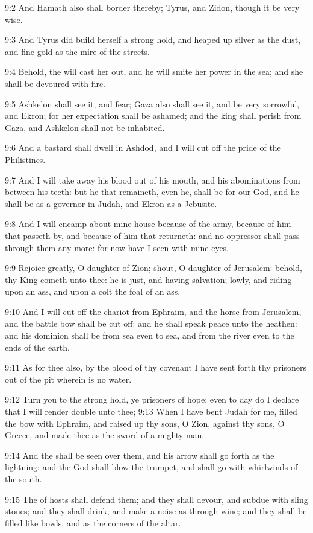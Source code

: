 9:2 And Hamath also shall border thereby; Tyrus, and Zidon, though it
be very wise.

9:3 And Tyrus did build herself a strong hold, and heaped up silver as
the dust, and fine gold as the mire of the streets.

9:4 Behold, the \LORD will cast her out, and he will smite her power in
the sea; and she shall be devoured with fire.

9:5 Ashkelon shall see it, and fear; Gaza also shall see it, and be
very sorrowful, and Ekron; for her expectation shall be ashamed; and
the king shall perish from Gaza, and Ashkelon shall not be inhabited.

9:6 And a bastard shall dwell in Ashdod, and I will cut off the pride
of the Philistines.

9:7 And I will take away his blood out of his mouth, and his
abominations from between his teeth: but he that remaineth, even he,
shall be for our God, and he shall be as a governor in Judah, and
Ekron as a Jebusite.

9:8 And I will encamp about mine house because of the army, because of
him that passeth by, and because of him that returneth: and no
oppressor shall pass through them any more: for now have I seen with
mine eyes.

9:9 Rejoice greatly, O daughter of Zion; shout, O daughter of
Jerusalem: behold, thy King cometh unto thee: he is just, and having
salvation; lowly, and riding upon an ass, and upon a colt the foal of
an ass.

9:10 And I will cut off the chariot from Ephraim, and the horse from
Jerusalem, and the battle bow shall be cut off: and he shall speak
peace unto the heathen: and his dominion shall be from sea even to
sea, and from the river even to the ends of the earth.

9:11 As for thee also, by the blood of thy covenant I have sent forth
thy prisoners out of the pit wherein is no water.

9:12 Turn you to the strong hold, ye prisoners of hope: even to day do
I declare that I will render double unto thee; 9:13 When I have bent
Judah for me, filled the bow with Ephraim, and raised up thy sons, O
Zion, against thy sons, O Greece, and made thee as the sword of a
mighty man.

9:14 And the \LORD shall be seen over them, and his arrow shall go
forth as the lightning: and the \LORD God shall blow the trumpet, and
shall go with whirlwinds of the south.

9:15 The \LORD of hosts shall defend them; and they shall devour, and
subdue with sling stones; and they shall drink, and make a noise as
through wine; and they shall be filled like bowls, and as the corners
of the altar.

